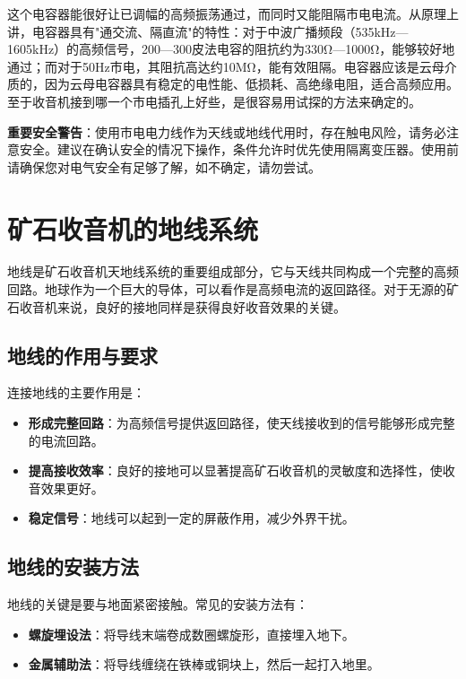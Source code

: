 \documentclass[12pt,UTF8]{ctexbook}
\begin{document}
这个电容器能很好让已调幅的高频振荡通过，而同时又能阻隔市电电流。从原理上讲，电容器具有"通交流、隔直流"的特性：对于中波广播频段（535kHz—1605kHz）的高频信号，200—300皮法电容的阻抗约为330Ω—1000Ω，能够较好地通过；而对于50Hz市电，其阻抗高达约10MΩ，能有效阻隔。电容器应该是云母介质的，因为云母电容器具有稳定的电性能、低损耗、高绝缘电阻，适合高频应用。至于收音机接到哪一个市电插孔上好些，是很容易用试探的方法来确定的。

\textbf{重要安全警告}：使用市电电力线作为天线或地线代用时，存在触电风险，请务必注意安全。建议在确认安全的情况下操作，条件允许时优先使用隔离变压器。使用前请确保您对电气安全有足够了解，如不确定，请勿尝试。

\chapter{矿石收音机的地线系统}

地线是矿石收音机天地线系统的重要组成部分，它与天线共同构成一个完整的高频回路。地球作为一个巨大的导体，可以看作是高频电流的返回路径。对于无源的矿石收音机来说，良好的接地同样是获得良好收音效果的关键。

\section{地线的作用与要求}

连接地线的主要作用是：
\begin{itemize}
	\item \textbf{形成完整回路}：为高频信号提供返回路径，使天线接收到的信号能够形成完整的电流回路。
	\item \textbf{提高接收效率}：良好的接地可以显著提高矿石收音机的灵敏度和选择性，使收音效果更好。
	\item \textbf{稳定信号}：地线可以起到一定的屏蔽作用，减少外界干扰。
\end{itemize}

\section{地线的安装方法}

地线的关键是要与地面紧密接触。常见的安装方法有：

\begin{itemize}
	\item \textbf{螺旋埋设法}：将导线末端卷成数圈螺旋形，直接埋入地下。
	\item \textbf{金属辅助法}：将导线缠绕在铁棒或铜块上，然后一起打入地里。
\end{itemize}
\end{document}
